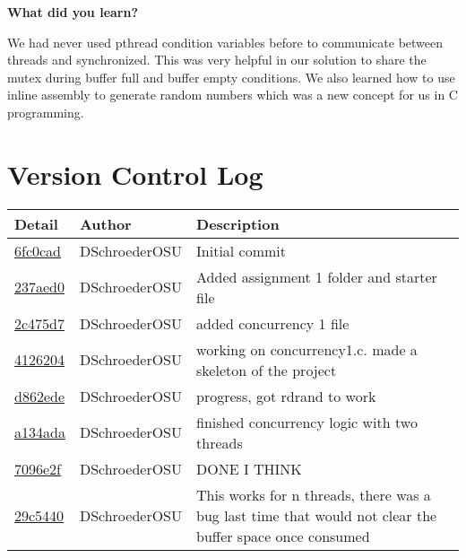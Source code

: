 \documentclass[10pt,letterpaper,draftclsnofoot,onecolumn]{IEEEtran}
\begin{document}
\bigskip

\noindent\textbf{What did you learn?}
\medskip

\noindent We had never used pthread condition variables before to communicate between threads and synchronized. This was very helpful in our solution to share the mutex during buffer full and buffer empty conditions. We also learned how to use inline assembly to generate random numbers which was a new concept for us in C programming.\par
\bigskip

\section{Version Control  Log}
\bigskip

\begin{tabular}{l l l}\textbf{Detail} & \textbf{Author} & \textbf{Description}\\\hline
\href{https://github.com/DSchroederOSU/CS444-Group\_11\_05/commit/6fc0cad45a2a515f54c120fa6d411cbb62a0eed5}{6fc0cad} & DSchroederOSU & Initial commit\\\hline
\href{https://github.com/DSchroederOSU/CS444-Group\_11\_05/commit/237aed09afe1e61e9421f419164f4d41387adddd}{237aed0} & DSchroederOSU & Added assignment 1 folder and starter file\\\hline
\href{https://github.com/DSchroederOSU/CS444-Group\_11\_05/commit/2c475d7e15d1a54406c275a2a27c5df472c46ded}{2c475d7} & DSchroederOSU & added concurrency 1 file\\\hline
\href{https://github.com/DSchroederOSU/CS444-Group\_11\_05/commit/4126204c49cd2e10090eb4d6bd3183bc23c94648}{4126204} & DSchroederOSU & working on concurrency1.c. made a skeleton of the project\\\hline
\href{https://github.com/DSchroederOSU/CS444-Group\_11\_05/commit/d862edec54dd0eb51bdde6e26337315a2675d434}{d862ede} & DSchroederOSU & progress, got rdrand to work\\\hline
\href{https://github.com/DSchroederOSU/CS444-Group\_11\_05/commit/a134adaeeff0b0ebc7bc662d809edc973ab6f841}{a134ada} & DSchroederOSU & finished concurrency logic with two threads\\\hline
\href{https://github.com/DSchroederOSU/CS444-Group\_11\_05/commit/7096e2f214d8f164dcf02c58d8924f903281e867}{7096e2f} & DSchroederOSU & DONE I THINK\\\hline
\href{https://github.com/DSchroederOSU/CS444-Group\_11\_05/commit/29c5440b4d14c3656d11c907e8794f6f08d98897}{29c5440} & DSchroederOSU & This works for n threads, there was a bug last time that would not clear the buffer space once consumed\\\hline

\end{tabular}
\end{document}
